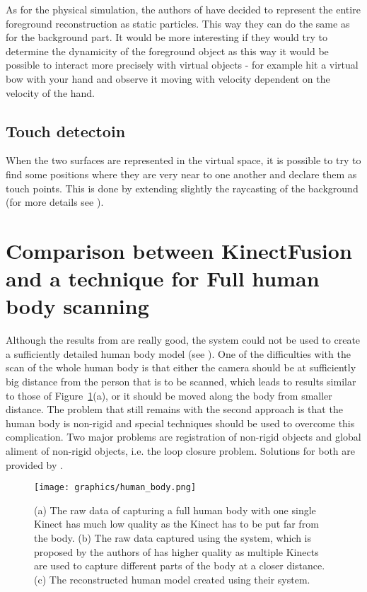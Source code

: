 \documentclass[12pt, a4paper]{article}
\theoremstyle{plain}
\begin{document}
    As for the physical simulation, the authors of \cite{kinectfusion} have
    decided to represent the entire foreground reconstruction as static
    particles. This way they can do the same as for the background part. It
    would be more interesting if they would try to determine the dynamicity of
    the foreground object as this way it would be possible to interact more
    precisely with virtual objects - for example hit a virtual bow with your
    hand and observe it moving with velocity dependent on the velocity of the
    hand.

  \subsection{Touch detectoin} %
  \label{sub:Touch detectoin}
    When the two surfaces are represented in the virtual space, it is possible
    to try to find some positions where they are very near to one another and
    declare them as touch points. This is done by extending slightly the
    raycasting of the background (for more details see \cite{kinectfusion}).

\section{Comparison between KinectFusion and a technique for Full human body
scanning} %
\label{sec:Comparison between KinectFusion and a technique for Full human body
scanning}
  Although the results from \cite{kinectfusion} are really good, the system
  could not be used to create a sufficiently detailed human body model (see
  \cite{body-scanning}). One of the difficulties with the scan of the whole
  human body is that either the camera should be at sufficiently big distance
  from the person that is to be scanned, which leads to results similar to those
  of Figure~\ref{fig:human-body}(a), or it should be moved along the body from
  smaller distance. The problem that still remains with the second approach is
  that the human body is non-rigid and special techniques should be used to
  overcome this complication. Two major problems are registration of non-rigid
  objects and global aliment of non-rigid objects, i.e. the loop closure
  problem. Solutions for both are provided by \cite{body-scanning}.

  \begin{figure}[h]
    \centering
    \texttt{[image: graphics/human\_body.png]}
    \caption{(a) The raw data of capturing a full human body with one single
      Kinect has much low quality as the Kinect has to be put far from the
      body. (b) The raw data captured using the system, which is proposed by the
      authors of \cite{body-scanning} has higher quality as multiple Kinects are
      used to capture different parts of the body at a closer distance. (c) The
      reconstructed human model created using their system.}
    \label{fig:human-body}
  \end{figure}
\end{document}
